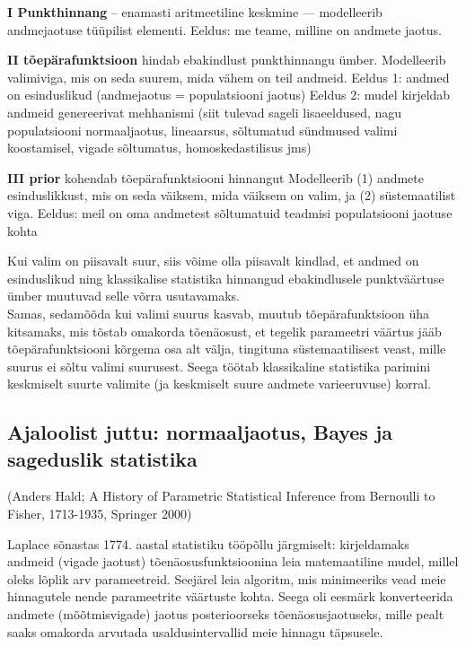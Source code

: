 \documentclass[]{book}
\begin{document}
\textbf{I Punkthinnang} -- enamasti aritmeetiline keskmine ---
modelleerib andmejaotuse tüüpilist elementi. Eeldus: me teame, milline
on andmete jaotus.

\textbf{II tõepärafunktsioon} hindab ebakindlust punkthinnangu ümber.
Modelleerib valimiviga, mis on seda suurem, mida vähem on teil andmeid.
Eeldus 1: andmed on esinduslikud (andmejaotus = populatsiooni jaotus)
Eeldus 2: mudel kirjeldab andmeid genereerivat mehhanismi (siit tulevad
sageli lisaeeldused, nagu populatsiooni normaaljaotus, lineaarsus,
sõltumatud sündmused valimi koostamisel, vigade sõltumatus,
homoskedastilisus jms)

\textbf{III prior} kohendab tõepärafunktsiooni hinnangut Modelleerib (1)
andmete esinduslikkust, mis on seda väiksem, mida väiksem on valim, ja
(2) süstemaatilist viga. Eeldus: meil on oma andmetest sõltumatuid
teadmisi populatsiooni jaotuse kohta

Kui valim on piisavalt suur, siis võime olla piisavalt kindlad, et
andmed on esinduslikud ning klassikalise statistika hinnangud
ebakindlusele punktväärtuse ümber muutuvad selle võrra usutavamaks.\\
Samas, sedamõõda kui valimi suurus kasvab, muutub tõepärafunktsioon üha
kitsamaks, mis tõstab omakorda tõenäosust, et tegelik parameetri väärtus
jääb tõepärafunktsiooni kõrgema osa alt välja, tingituna
süstemaatilisest veast, mille suurus ei sõltu valimi suurusest. Seega
töötab klassikaline statistika parimini keskmiselt suurte valimite (ja
keskmiselt suure andmete varieeruvuse) korral.

\subsection{Ajaloolist juttu: normaaljaotus, Bayes ja sageduslik
statistika}\label{ajaloolist-juttu-normaaljaotus-bayes-ja-sageduslik-statistika}

(Anders Hald; A History of Parametric Statistical Inference from
Bernoulli to Fisher, 1713-1935, Springer 2000)

Laplace sõnastas 1774. aastal statistiku tööpõllu järgmiselt:
kirjeldamaks andmeid (vigade jaotust) tõenäosusfunktsioonina leia
matemaatiline mudel, millel oleks lõplik arv parameetreid. Seejärel leia
algoritm, mis minimeeriks vead meie hinnagutele nende parameetrite
väärtuste kohta. Seega oli eesmärk konverteerida andmete (mõõtmisvigade)
jaotus posterioorseks tõenäosusjaotuseks, mille pealt saaks omakorda
arvutada usaldusintervallid meie hinnagu täpsusele.
\end{document}
